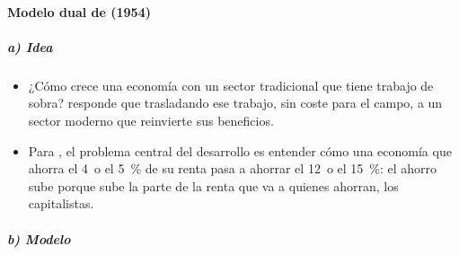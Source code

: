\documentclass[11pt]{article}
\begin{document}
\paragraph{Modelo dual de  (1954)}

\subparagraph{a) Idea}

\begin{itemize}
\item ¿Cómo crece una economía con un sector tradicional que tiene trabajo de sobra? \textcite{Lewis1954} responde que trasladando ese trabajo, sin coste para el campo, a un sector moderno que reinvierte sus beneficios.
\item Para , el problema central del desarrollo es entender cómo una economía que ahorra el 4~o el 5~\% de su renta pasa a ahorrar el 12~o el 15~\%: el ahorro sube porque sube la parte de la renta que va a quienes ahorran, los capitalistas.
\end{itemize}

\subparagraph{b) Modelo}
\end{document}
